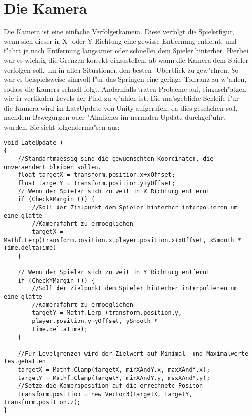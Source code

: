 \chapter{Die Kamera}
Die Kamera ist eine einfache Verfolgerkamera. Diese verfolgt die Spielerfigur, wenn sich dieser in X- oder Y-Richtung eine gewisse Entfernung entfernt, und f"ahrt je nach Entfernung langsamer oder schneller dem Spieler hinterher. Hierbei war es wichtig die Grenzen korrekt einzustellen, ab wann die Kamera dem Spieler verfolgen soll, um in allen Situationen den besten "Uberblick zu gew"ahren. So war es beispielsweise sinnvoll f"ur das Springen eine geringe Toleranz zu w"ahlen, sodass die Kamera schnell folgt. Andernfalls traten Probleme auf, einzusch"atzen wie in vertikalen Levels der Pfad zu w"ahlen ist.
Die ma"sgebliche Schleife f"ur die Kamera wird im LateUpdate von Unity aufgerufen, da dies geschehen soll, nachdem Bewegungen oder "Ahnliches im normalen Update durchgef"uhrt wurden.
Sie sieht folgenderma"sen aus:
\begin{lstlisting}[breaklines=true]
void LateUpdate()
{
	//Standartmaessig sind die gewuenschten Koordinaten, die unveraendert bleiben sollen.
	float targetX = transform.position.x+xOffset;
	float targetY = transform.position.y+yOffset;
	// Wenn der Spieler sich zu weit in X Richtung entfernt
	if (CheckXMargin ()) {
		//Soll der Zielpunkt dem Spieler hinterher interpolieren um eine glatte
		//Kamerafahrt zu ermoeglichen
		targetX = Mathf.Lerp(transform.position.x,player.position.x+xOffset, xSmooth * Time.deltaTime);
	}

	// Wenn der Spieler sich zu weit in Y Richtung entfernt
	if (CheckYMargin ()) {
		//Soll der Zielpunkt dem Spieler hinterher interpolieren um eine glatte
		//Kamerafahrt zu ermoeglichen
		targetY = Mathf.Lerp (transform.position.y,
		player.position.y+yOffset, ySmooth *
		Time.deltaTime);
	}
	
	//Fur Levelgrenzen wird der Zielwert auf Minimal- und Maximalwerte festgehalten
	targetX = Mathf.Clamp(targetX, minXAndY.x, maxXAndY.x);
	targetY = Mathf.Clamp(targetY, minXAndY.y, maxXAndY.y);
	//Setze die Kameraposition auf die errechnete Positon
	transform.position = new Vector3(targetX, targetY, transform.position.z);
}
\end{lstlisting}